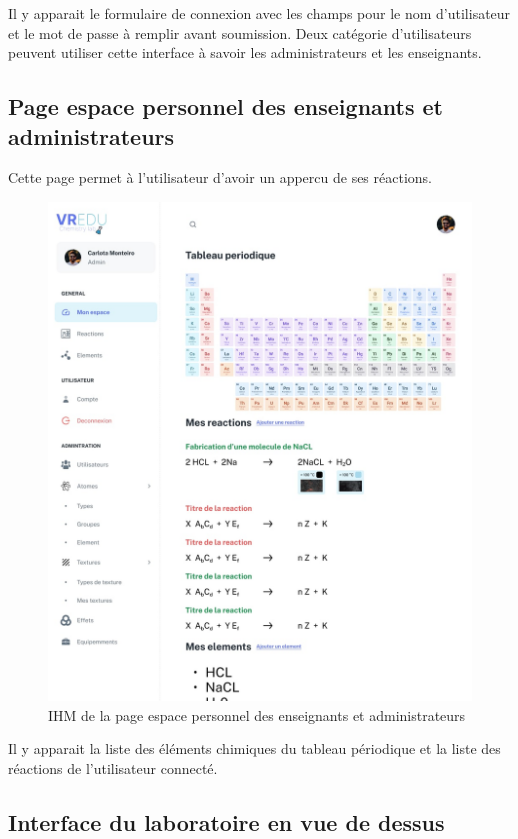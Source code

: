 Il y apparait le formulaire de connexion avec les champs pour le nom d'utilisateur et le mot de passe à remplir avant soumission. 
Deux catégorie d'utilisateurs peuvent utiliser cette interface à savoir les administrateurs et les enseignants.

\subsection{Page espace personnel des enseignants et administrateurs}

Cette page permet à l'utilisateur d'avoir un appercu de ses réactions.

\begin{figure}[H]
	\centering
	\includegraphics[width=1\textwidth]{img/esp}
	\caption{IHM de la page espace personnel des enseignants et administrateurs}
	\label{fig:mesh1}
\end{figure}

Il y apparait la liste des éléments chimiques du tableau périodique et la liste des réactions de l'utilisateur connecté.

\subsection{Interface du laboratoire en vue de dessus}

